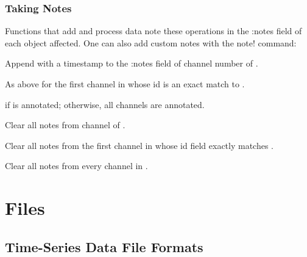 \documentclass[letterpaper,11pt,english]{sphinxmanual}
\begin{document}
\subsection{Taking Notes}
\label{\detokenize{src/working_with_data:taking-notes}}
Functions that add and process data note these operations in the :notes field
of each object affected. One can also add custom notes with the note! command:


\begin{fulllineitems}
\end{fulllineitems}


Append  with a timestamp to the :notes field of channel number  of .


\begin{fulllineitems}
\end{fulllineitems}


As above for the first channel in  whose id is an exact match to .


\begin{fulllineitems}
\end{fulllineitems}


if  is annotated; otherwise, all channels are annotated.

Clear all notes from channel  of .


Clear all notes from the first channel in  whose id field exactly matches .


Clear all notes from every channel in .


\chapter{Files}
\label{\detokenize{index:files}}

\section{Time-Series Data File Formats}
\label{\detokenize{src/Formats/timeseries:time-series-data-file-formats}}\label{\detokenize{src/Formats/timeseries:readdata}}\label{\detokenize{src/Formats/timeseries::doc}}
\end{document}

